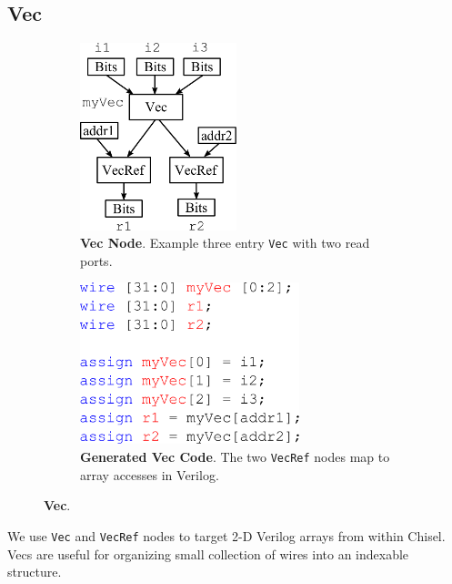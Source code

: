 \subsection{Vec}
\begin{figure}[hb]
\centering
  \begin{subfigure}[t]{0.48\textwidth}
  \centering
  \includegraphics[width=0.5\textwidth]{figures/vecnode.pdf}
  \caption{{\bf Vec Node}. Example three entry {\tt Vec} with two
    read ports.}
  \label{fig:vecnode}
  \end{subfigure}
  \hfill
  \begin{subfigure}[t]{0.48\textwidth}
  \centering
  \includegraphics[width=0.7\textwidth]{figures/vecv.pdf}
  \caption{{\bf Generated Vec Code}. The two {\tt VecRef} nodes map to
  array accesses in Verilog.}
  \label{fig:vecv}
  \end{subfigure}
\caption{{\bf Vec}.}
\label{fig:vec}
\end{figure}

We use {\tt Vec} and {\tt VecRef} nodes to target 2-D Verilog arrays
from within Chisel. Vecs are useful for organizing small collection of
wires into an indexable structure.

